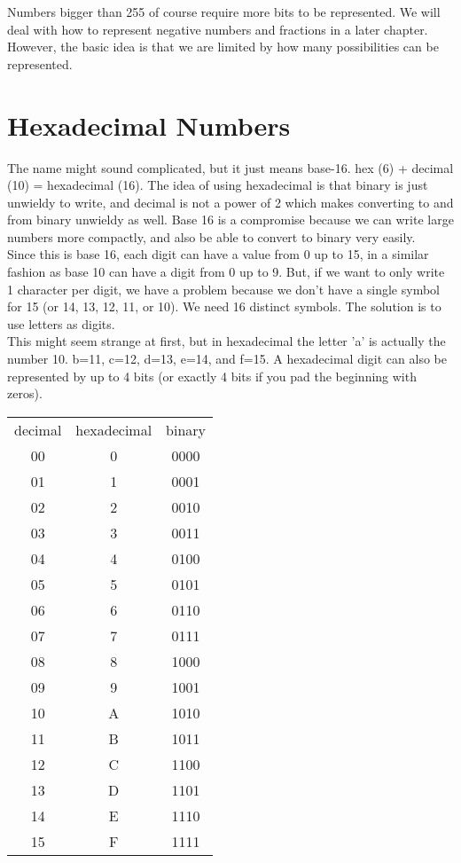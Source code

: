 Numbers bigger than 255 of course require more bits to be represented. We will deal with how to represent negative numbers and fractions in a later chapter. However, the basic idea is that we are limited by how many possibilities can be represented.

\section{Hexadecimal Numbers}

The name might sound complicated, but it just means base-16. hex (6) + decimal (10) = hexadecimal (16). The idea of using hexadecimal is that binary is just unwieldy to write, and decimal is not a power of 2 which makes converting to and from binary unwieldy as well. Base 16 is a compromise because we can write large numbers more compactly, and also be able to convert to binary very easily.\\

Since this is base 16, each digit can have a value from 0 up to 15, in a similar fashion as base 10 can have a digit from 0 up to 9. But, if we want to only write 1 character per digit, we have a problem because we don't have a single symbol for 15 (or 14, 13, 12, 11, or 10). We need 16 distinct symbols. The solution is to use letters as digits.\\

This might seem strange at first, but in hexadecimal the letter 'a' is actually the number 10. b=11, c=12, d=13, e=14, and f=15. A hexadecimal digit can also be represented by up to 4 bits (or exactly 4 bits if you pad the beginning with zeros).

\begin{center}
	\begin{tabular}{c | c | c}
		decimal & hexadecimal & binary \\
		00 & 0 & 0000 \\
		01 & 1 & 0001 \\
		02 & 2 & 0010 \\
		03 & 3 & 0011 \\
		04 & 4 & 0100 \\
		05 & 5 & 0101 \\
		06 & 6 & 0110 \\
		07 & 7 & 0111 \\
		08 & 8 & 1000 \\
		09 & 9 & 1001 \\
		10 & A & 1010 \\
		11 & B & 1011 \\
		12 & C & 1100 \\
		13 & D & 1101 \\
		14 & E & 1110 \\
		15 & F & 1111 \\
	\end{tabular}
\end{center}

